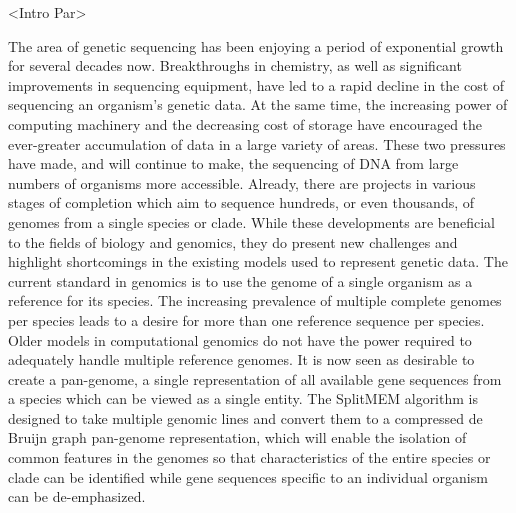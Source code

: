 \documentclass{paper}
\begin{document}
<Intro Par>
\newline\newline

The area of genetic sequencing has been enjoying a period of
 exponential growth for several decades now. Breakthroughs in
  chemistry, as well as significant improvements in sequencing
  equipment, have led to a rapid decline in the cost of sequencing an
  organism's genetic data. At the same time, the increasing power of
   computing machinery and the decreasing cost of storage have encouraged the ever-greater accumulation of data in a large variety of areas. These two pressures have made, and will continue to make, the sequencing of DNA from large numbers of organisms more accessible. Already, there are projects in various stages of completion which aim to sequence hundreds, or even thousands, of genomes from a single species or clade. While these developments are beneficial to the fields of biology and genomics, they do present new challenges and highlight shortcomings in the existing models used to represent genetic data. The current standard in genomics is to use the genome of a single organism as a reference for its species. The increasing prevalence of multiple complete genomes per species leads to a desire for more than one reference sequence per species. Older models in computational genomics do not have the power required to adequately handle multiple reference genomes. It is now seen as desirable to create a pan-genome, a single representation of all available gene sequences from a species which can be viewed as a single entity. The SplitMEM algorithm is designed to take multiple genomic lines and convert them to a compressed de Bruijn graph pan-genome representation, which will enable the isolation of common features in the genomes so that characteristics of the entire species or clade can be identified while gene sequences specific to an individual organism can be de-emphasized.
\newline\newline
\end{document}
